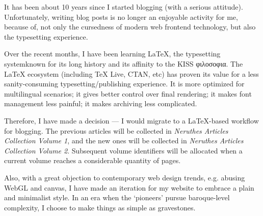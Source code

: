 
It has been about 10 years since I started blogging (with a serious attitude).
Unfortunately, writing blog posts is no longer an enjoyable activity for me,
because of, not only the cursedness of modern web frontend technology,
but also the typesetting experience.

Over the recent months, I have been learning LaTeX,
the typesetting system\linebreak known for its long history and its affinity to the KISS φιλοσοφια.
The LaTeX ecosystem (including TeX Live, CTAN, etc)
has proven its value for a less sanity-consuming typesetting/publishing experience.
It is more optimized for multilingual scenarios; it gives better control over final rendering;
it makes font management less painful; it makes archiving less complicated.

Therefore, I have made a decision ---
I would migrate to a LaTeX-based workflow for blogging.
The previous articles will be collected in \textit{Neruthes Articles Collection Volume 1},
and the new ones will be collected in \textit{Neruthes Articles Collection Volume 2}.
Subsequent volume identifiers will be allocated when a current volume reaches a considerable quantity of pages.

Also, with a great objection to contemporary web design trends,
e.g. abusing WebGL and canvas,
I have made an iteration for my website to embrace a plain and minimalist style.
In an era when the `pioneers' pursue baroque-level complexity,
I choose to make things as simple as gravestones.
